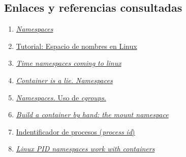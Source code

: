 \documentclass[a4paper, oneside, 12pt]{book}
\begin{document}
	\subsection*{Enlaces y referencias consultadas}
	\begin{enumerate}
		\item 
		\label{bib:ns overview} \href{https://lwn.net/Articles/531114/}{\textit{Namespaces}}
		
		\item 
		\label{bib:ns tutorial1} \href{https://laurel.datsi.fi.upm.es/~ssoo/SOA/namespaces.html}{Tutorial: Espacio de nombres en Linux}
		
		\item 
		\label{bib:time ns} \href{https://www.phoronix.com/scan.php?page=news_item&px=Linux-Time-Namespace-Coming}{\textit{Time namespaces coming to linux}}
		
		\item 
		\label{bib:container is a lie} \href{https://platform.sh/blog/2020/the-container-is-a-lie/}{\textit{Container is a lie. Namespaces}}
		
		\item 
		\label{bib:link5} \href{https://locurastecnicas.blogspot.com/2020/09/linux-namespaces-y-cgroups.html}{\textit{Namespaces.} Uso de \textit{cgroups}.}
		
		
		
		\item
		\label{bib: mount namespace redhat} \href{https://www.redhat.com/sysadmin/mount-namespaces}{\textit{Build a container by hand: the mount namespace}}
		
		
		\item
		\label{bib:pid wikipedia}
		\href{https://en.wikipedia.org/wiki/Process_identifier}{Indentificador de procesos (\textit{process id})}
		
		
		\item
		\label{bib:link9}
		\href{https://www.redhat.com/sysadmin/linux-pid-namespaces}{\textit{Linux PID namespaces work with containers}}
		
		

\end{enumerate}
\end{document}
